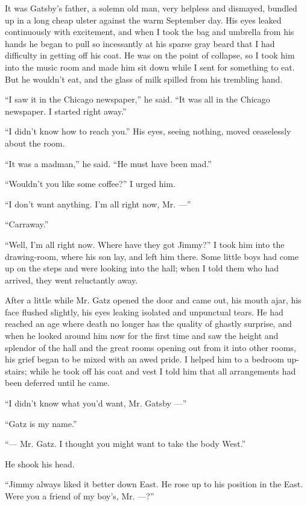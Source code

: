 \documentclass{znotebook}
\begin{document}
It was Gatsby's father, a solemn old man, very helpless and dismayed, bundled up in a long cheap ulster against the warm September day. His eyes leaked continuously with excitement, and when I took the bag and umbrella from his hands he began to pull so incessantly at his sparse gray beard that I had difficulty in getting off his coat. He was on the point of collapse, so I took him into the music room and made him sit down while I sent for something to eat. But he wouldn't eat, and the glass of milk spilled from his trembling hand.

``I saw it in the Chicago newspaper,'' he said. ``It was all in the Chicago newspaper. I started right away.''

``I didn't know how to reach you.'' His eyes, seeing nothing, moved ceaselessly about the room.

``It was a madman,'' he said. ``He must have been mad.''

``Wouldn't you like some coffee?'' I urged him.

``I don't want anything. I'm all right now, Mr. ---''

``Carraway.''

``Well, I'm all right now. Where have they got Jimmy?'' I took him into the drawing-room, where his son lay, and left him there. Some little boys had come up on the steps and were looking into the hall; when I told them who had arrived, they went reluctantly away.

After a little while Mr. Gatz opened the door and came out, his mouth ajar, his face flushed slightly, his eyes leaking isolated and unpunctual tears. He had reached an age where death no longer has the quality of ghastly surprise, and when he looked around him now for the first time and saw the height and splendor of the hall and the great rooms opening out from it into other rooms, his grief began to be mixed with an awed pride. I helped him to a bedroom up-stairs; while he took off his coat and vest I told him that all arrangements had been deferred until he came.

``I didn't know what you'd want, Mr. Gatsby ---''

``Gatz is my name.''

``---{} Mr. Gatz. I thought you might want to take the body West.''

He shook his head.

``Jimmy always liked it better down East. He rose up to his position in the East. Were you a friend of my boy's, Mr. ---{}?''
\end{document}
